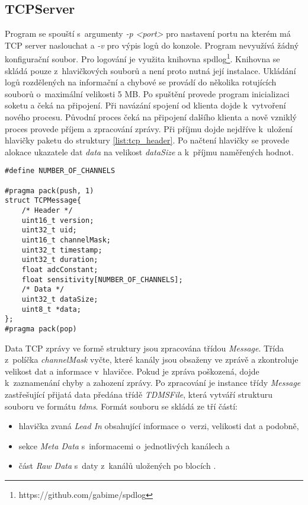 \subsection{TCPServer}
Program se spouští s~argumenty \textit{-p <port>} pro nastavení portu na kterém má TCP server naslouchat a \textit{-v} pro výpis logů do konzole. Program nevyužívá žádný konfigurační soubor. Pro logování je využita knihovna spdlog\footnote{https://github.com/gabime/spdlog}. Knihovna se skládá pouze z~hlavičkových souborů a není proto nutná její instalace. Ukládání logů rozdělených na informační a chybové se provádí do několika rotujících souborů o~maximální velikosti 5 MB. Po spuštění provede program inicializaci soketu a čeká na připojení. Při navázání spojení od klienta dojde k~vytvoření nového procesu. Původní proces čeká na připojení dalšího klienta a nově vzniklý proces provede příjem a zpracování zprávy. Při příjmu dojde nejdříve k~uložení hlavičky paketu do struktury \ref{list:tcp_header}. Po načtení hlavičky se provede alokace ukazatele dat \textit{data} na velikost \textit{dataSize} a k~příjmu naměřených hodnot. 
\begin{lstlisting}[style=c++, caption={Struktura pro příjem TCP zprávy.}, label={list:tcp_header}]
#define NUMBER_OF_CHANNELS

#pragma pack(push, 1)
struct TCPMessage{
    /* Header */
    uint16_t version;
    uint32_t uid;
    uint16_t channelMask;
    uint32_t timestamp;
    uint32_t duration;
    float adcConstant;
    float sensitivity[NUMBER_OF_CHANNELS];
    /* Data */
    uint32_t dataSize;
    uint8_t *data;
};
#pragma pack(pop)
\end{lstlisting}
Data TCP zprávy ve formě struktury jsou zpracována třídou \textit{Message}. Třída z~políčka \textit{channelMask} vyčte, které kanály jsou obsaženy ve zprávě a zkontroluje velikost dat a informace v~hlavičce. Pokud je zpráva poškozená, dojde k~zaznamenání chyby a zahození zprávy. Po zpracování je instance třídy \textit{Message} zastřešující přijatá data předána třídě \textit{TDMSFile}, která vytváří strukturu souboru ve formátu \textit{tdms}. Formát souboru se skládá ze tří částí: 
\begin{itemize}
    \item hlavička zvaná \textit{Lead In} obsahující informace o~verzi, velikosti dat a podobně,
    \item sekce \textit{Meta Data} s~informacemi o~jednotlivých kanálech a
    \item část \textit{Raw Data} s~daty z~kanálů uložených po blocích \cite{tdmsFileFormat}.
\end{itemize}
